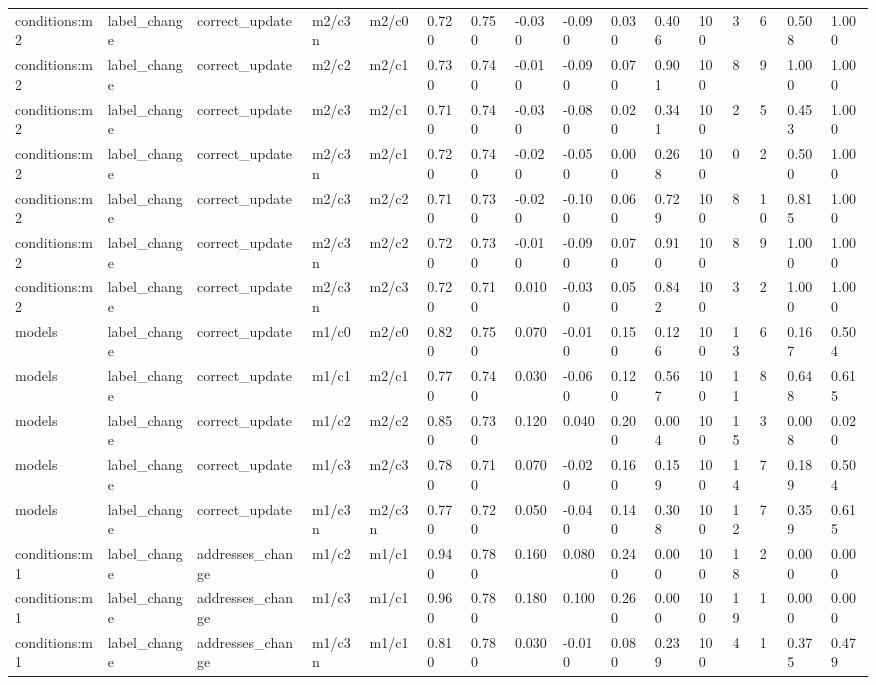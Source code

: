 \begin{tabular}{llllllllllllllll}
conditions:m2 & label\_change & correct\_update & m2/c3n & m2/c0 & 0.720 & 0.750 & -0.030 & -0.090 & 0.030 & 0.406 & 100 & 3 & 6 & 0.508 & 1.000 \\
conditions:m2 & label\_change & correct\_update & m2/c2 & m2/c1 & 0.730 & 0.740 & -0.010 & -0.090 & 0.070 & 0.901 & 100 & 8 & 9 & 1.000 & 1.000 \\
conditions:m2 & label\_change & correct\_update & m2/c3 & m2/c1 & 0.710 & 0.740 & -0.030 & -0.080 & 0.020 & 0.341 & 100 & 2 & 5 & 0.453 & 1.000 \\
conditions:m2 & label\_change & correct\_update & m2/c3n & m2/c1 & 0.720 & 0.740 & -0.020 & -0.050 & 0.000 & 0.268 & 100 & 0 & 2 & 0.500 & 1.000 \\
conditions:m2 & label\_change & correct\_update & m2/c3 & m2/c2 & 0.710 & 0.730 & -0.020 & -0.100 & 0.060 & 0.729 & 100 & 8 & 10 & 0.815 & 1.000 \\
conditions:m2 & label\_change & correct\_update & m2/c3n & m2/c2 & 0.720 & 0.730 & -0.010 & -0.090 & 0.070 & 0.910 & 100 & 8 & 9 & 1.000 & 1.000 \\
conditions:m2 & label\_change & correct\_update & m2/c3n & m2/c3 & 0.720 & 0.710 & 0.010 & -0.030 & 0.050 & 0.842 & 100 & 3 & 2 & 1.000 & 1.000 \\
models & label\_change & correct\_update & m1/c0 & m2/c0 & 0.820 & 0.750 & 0.070 & -0.010 & 0.150 & 0.126 & 100 & 13 & 6 & 0.167 & 0.504 \\
models & label\_change & correct\_update & m1/c1 & m2/c1 & 0.770 & 0.740 & 0.030 & -0.060 & 0.120 & 0.567 & 100 & 11 & 8 & 0.648 & 0.615 \\
models & label\_change & correct\_update & m1/c2 & m2/c2 & 0.850 & 0.730 & 0.120 & 0.040 & 0.200 & 0.004 & 100 & 15 & 3 & 0.008 & 0.020 \\
models & label\_change & correct\_update & m1/c3 & m2/c3 & 0.780 & 0.710 & 0.070 & -0.020 & 0.160 & 0.159 & 100 & 14 & 7 & 0.189 & 0.504 \\
models & label\_change & correct\_update & m1/c3n & m2/c3n & 0.770 & 0.720 & 0.050 & -0.040 & 0.140 & 0.308 & 100 & 12 & 7 & 0.359 & 0.615 \\
conditions:m1 & label\_change & addresses\_change & m1/c2 & m1/c1 & 0.940 & 0.780 & 0.160 & 0.080 & 0.240 & 0.000 & 100 & 18 & 2 & 0.000 & 0.000 \\
conditions:m1 & label\_change & addresses\_change & m1/c3 & m1/c1 & 0.960 & 0.780 & 0.180 & 0.100 & 0.260 & 0.000 & 100 & 19 & 1 & 0.000 & 0.000 \\
conditions:m1 & label\_change & addresses\_change & m1/c3n & m1/c1 & 0.810 & 0.780 & 0.030 & -0.010 & 0.080 & 0.239 & 100 & 4 & 1 & 0.375 & 0.479 \\

\end{tabular}
